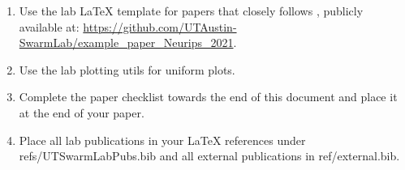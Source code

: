 \begin{enumerate}
    \item Use the lab LaTeX template for papers that closely follows \cite{cheng2021data}, publicly available at: \url{https://github.com/UTAustin-SwarmLab/example_paper_Neurips_2021}.
    \item Use the lab plotting utils for uniform plots.
    \item Complete the paper checklist towards the end of this document and place it at the end of your paper.
    \item Place all lab publications in your LaTeX references under refs/UTSwarmLabPubs.bib and all external publications in ref/external.bib.
\end{enumerate}




